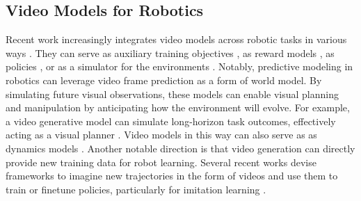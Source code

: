 \subsection{Video Models for Robotics}
Recent work increasingly integrates video models across robotic tasks in various ways \cite{yang2024video,mccarthy2025towards}. They can serve as auxiliary training objectives \cite{wu2023unleashing,seo2022reinforcement,wu2023pre,yang2024spatiotemporal,hu2024video,li2025unified}, as reward models \cite{huang2024diffusion,escontrela2023video,chen2021learning}, as policies \cite{ajay2023compositional,du2023learning}, or as a simulator for the environments \cite{valevski2024diffusion,bruce2024genie}. 
Notably, predictive modeling in robotics can leverage video frame prediction as a form of world model. By simulating future visual observations, these models can enable visual planning and manipulation by anticipating how the environment will evolve. For example, a video generative model can simulate long-horizon task outcomes, effectively acting as a visual planner \cite{luo2024grounding}. Video models in this way can also serve as 
as dynamics models \cite{du2023learning,yang2023learning,zhou2024robodreamer,rybkin2018learning,mendonca2023structured,che2024gamegen}.
Another notable direction is that video generation can directly provide new training data for robot learning. Several recent works devise frameworks to imagine new trajectories in the form of videos and use them to train or finetune policies, particularly for imitation learning \cite{jang2025dreamgen,liang2024dreamitate}.
